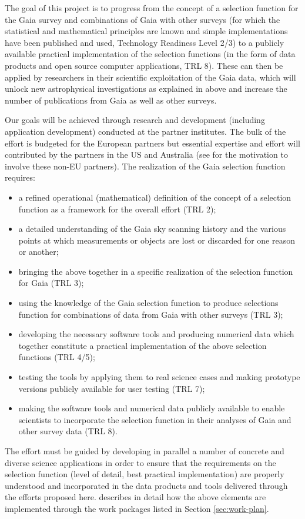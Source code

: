 The goal of this project is to progress from the concept of a selection function for the Gaia survey  and combinations of Gaia with other surveys (for which the statistical and mathematical principles are known and simple implementations have been published and used, Technology Readiness Level 2/3) to a publicly available practical implementation of the selection functions (in the form of data products and open source computer applications, TRL 8). These can then be applied by researchers in their scientific exploitation of the Gaia data, which will unlock new astrophysical investigations as explained in  above and increase the number of publications from Gaia as well as other surveys. 

Our goals will be achieved through research and development (including application development) conducted at the {\acro} partner institutes. The bulk of the effort is budgeted for the European partners but essential expertise and effort will contributed by the partners in the US and Australia (see  for the motivation to involve these non-EU partners). The realization of the Gaia selection function requires: 
\begin{itemize}
    \item a refined operational (mathematical) definition of the concept of a selection function as a framework for the overall effort (TRL 2);
    \item a detailed understanding of the Gaia sky scanning history and the various points at which measurements or objects are lost or discarded for one reason or another;
    \item bringing the above together in a specific realization of the selection function for Gaia (TRL 3);
    \item using the knowledge of the Gaia selection function to produce selections function for combinations of data from Gaia with other surveys (TRL 3);
    \item developing the necessary software tools and producing numerical data which together constitute a practical implementation of the above selection functions (TRL 4/5);
    \item testing the tools by applying them to real science cases and making prototype versions publicly available for user testing (TRL 7);
    \item making the software tools and numerical data publicly available to enable scientists to incorporate the selection function in their analyses of Gaia and other survey data (TRL 8).
\end{itemize}
The {\acro} effort must be guided by developing in parallel a number of concrete and diverse science applications in order to ensure that the requirements on the selection function (level of detail, best practical implementation) are properly understood and incorporated in the data products and tools delivered through the efforts proposed here.  describes in detail how the above elements are implemented through the work packages listed in Section \ref{sec:work-plan}.

